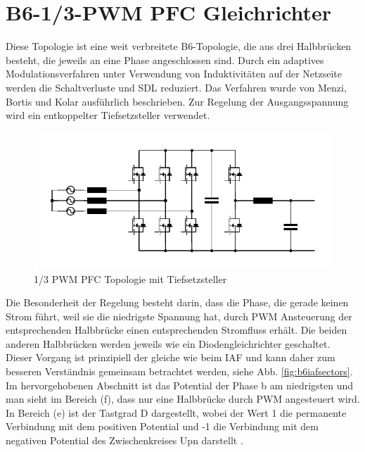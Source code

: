 \section{B6-1/3-PWM PFC Gleichrichter}
	\label{sec:GrundlagenB6}
	Diese Topologie ist eine weit verbreitete B6-Topologie, die aus drei Halbbrücken besteht, die jeweils an eine Phase angeschlossen sind. Durch ein adaptives Modulationsverfahren unter Verwendung von Induktivitäten auf der Netzseite werden die Schaltverluste und \gls{SDL} reduziert. Das Verfahren wurde von Menzi, Bortis und Kolar \cite{13PWMPFC} ausführlich beschrieben. Zur Regelung der Ausgangsspannung wird ein entkoppelter Tiefsetzsteller verwendet.\\
	
	\begin{figure}
		\centering
		\includegraphics[width=0.9\linewidth]{content/Grafiken/B6_Buck}
		\caption[1/3 PWM PFC Topologie mit Tiefsetzsteller]{1/3 PWM PFC Topologie mit Tiefsetzsteller}
		\label{fig:b6buck}
	\end{figure}
	
	Die Besonderheit der Regelung besteht darin, dass die Phase, die gerade keinen Strom führt, weil sie die niedrigste Spannung hat, durch \gls{PWM} Ansteuerung der entsprechenden Halbbrücke einen entsprechenden Stromfluss erhält. Die beiden anderen Halbbrücken werden jeweils wie ein Diodengleichrichter geschaltet. Dieser Vorgang ist prinzipiell der gleiche wie beim \gls{IAF} und kann daher zum besseren Verständnis gemeinsam betrachtet werden, siehe Abb. \ref{fig:b6iafsectors}.
	Im hervorgehobenen Abschnitt ist das Potential der Phase b am niedrigsten und man sieht im Bereich (f), dass nur eine Halbbrücke durch \gls{PWM} angesteuert wird. In Bereich (e) ist der Tastgrad \gls{D} dargestellt, wobei der Wert 1 die permanente Verbindung mit dem positiven Potential und -1 die Verbindung mit dem negativen Potential des Zwischenkreises \gls{Upn} darstellt \cite{13PWMPFC}.\\ 
		
